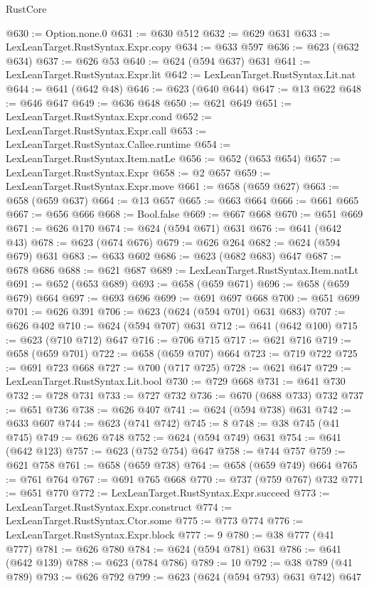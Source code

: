 \begin{lexlean}{RustCore}
\begin{coremodule}
@630 := Option.none.{0}
@631 := @630 @512
@632 := @629 @631
@633 := LexLeanTarget.RustSyntax.Expr.copy
@634 := @633 @597
@636 := @623 (@632 @634)
@637 := @626 @53
@640 := @624 (@594 @637) @631
@641 := LexLeanTarget.RustSyntax.Expr.lit
@642 := LexLeanTarget.RustSyntax.Lit.nat
@644 := @641 (@642 @48)
@646 := @623 (@640 @644)
@647 := @13 @622
@648 := @646 @647
@649 := @636 @648
@650 := @621 @649
@651 := LexLeanTarget.RustSyntax.Expr.cond
@652 := LexLeanTarget.RustSyntax.Expr.call
@653 := LexLeanTarget.RustSyntax.Callee.runtime
@654 := LexLeanTarget.RustSyntax.Item.natLe
@656 := @652 (@653 @654)
@657 := LexLeanTarget.RustSyntax.Expr
@658 := @2 @657
@659 := LexLeanTarget.RustSyntax.Expr.move
@661 := @658 (@659 @627)
@663 := @658 (@659 @637)
@664 := @13 @657
@665 := @663 @664
@666 := @661 @665
@667 := @656 @666
@668 := Bool.false
@669 := @667 @668
@670 := @651 @669
@671 := @626 @170
@674 := @624 (@594 @671) @631
@676 := @641 (@642 @43)
@678 := @623 (@674 @676)
@679 := @626 @264
@682 := @624 (@594 @679) @631
@683 := @633 @602
@686 := @623 (@682 @683) @647
@687 := @678 @686
@688 := @621 @687
@689 := LexLeanTarget.RustSyntax.Item.natLt
@691 := @652 (@653 @689)
@693 := @658 (@659 @671)
@696 := @658 (@659 @679) @664
@697 := @693 @696
@699 := @691 @697 @668
@700 := @651 @699
@701 := @626 @391
@706 := @623 (@624 (@594 @701) @631 @683)
@707 := @626 @402
@710 := @624 (@594 @707) @631
@712 := @641 (@642 @100)
@715 := @623 (@710 @712) @647
@716 := @706 @715
@717 := @621 @716
@719 := @658 (@659 @701)
@722 := @658 (@659 @707) @664
@723 := @719 @722
@725 := @691 @723 @668
@727 := @700 (@717 @725)
@728 := @621 @647
@729 := LexLeanTarget.RustSyntax.Lit.bool
@730 := @729 @668
@731 := @641 @730
@732 := @728 @731
@733 := @727 @732
@736 := @670 (@688 @733) @732
@737 := @651 @736
@738 := @626 @407
@741 := @624 (@594 @738) @631
@742 := @633 @607
@744 := @623 (@741 @742)
@745 := 8
@748 := @38 @745 (@41 @745)
@749 := @626 @748
@752 := @624 (@594 @749) @631
@754 := @641 (@642 @123)
@757 := @623 (@752 @754) @647
@758 := @744 @757
@759 := @621 @758
@761 := @658 (@659 @738)
@764 := @658 (@659 @749) @664
@765 := @761 @764
@767 := @691 @765 @668
@770 := @737 (@759 @767) @732
@771 := @651 @770
@772 := LexLeanTarget.RustSyntax.Expr.succeed
@773 := LexLeanTarget.RustSyntax.Expr.construct
@774 := LexLeanTarget.RustSyntax.Ctor.some
@775 := @773 @774
@776 := LexLeanTarget.RustSyntax.Expr.block
@777 := 9
@780 := @38 @777 (@41 @777)
@781 := @626 @780
@784 := @624 (@594 @781) @631
@786 := @641 (@642 @139)
@788 := @623 (@784 @786)
@789 := 10
@792 := @38 @789 (@41 @789)
@793 := @626 @792
@799 := @623 (@624 (@594 @793) @631 @742) @647

\end{coremodule}
\end{lexlean}
